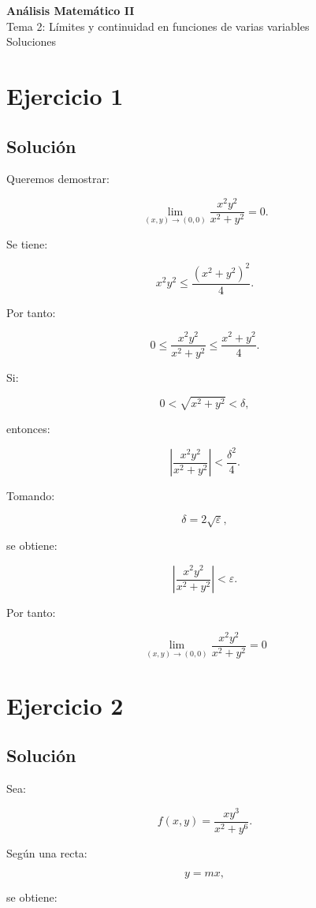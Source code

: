 \documentclass[11pt,a4paper]{article}
\begin{document}
\begin{center}
{\LARGE\bfseries Análisis Matemático II}\\[0.4em]
{\Large Tema 2: Límites y continuidad en funciones de varias variables}\\[0.4em]
{\large Soluciones}
\end{center}

\section{Ejercicio 1}
\subsection{Solución}

Queremos demostrar:

\[
\lim_{(x,y)\to(0,0)}
\frac{x^2y^2}{x^2+y^2}
=
0.
\]

Se tiene:

\[
x^2y^2
\leq
\frac{(x^2+y^2)^2}{4}.
\]

Por tanto:

\[
0
\leq
\frac{x^2y^2}{x^2+y^2}
\leq
\frac{x^2+y^2}{4}.
\]

Si:

\[
0<\sqrt{x^2+y^2}<\delta,
\]

entonces:

\[
\left|
\frac{x^2y^2}{x^2+y^2}
\right|
<
\frac{\delta^2}{4}.
\]

Tomando:

\[
\delta=2\sqrt{\varepsilon},
\]

se obtiene:

\[
\left|
\frac{x^2y^2}{x^2+y^2}
\right|
<
\varepsilon.
\]

Por tanto:

\[
\boxed{
\lim_{(x,y)\to(0,0)}
\frac{x^2y^2}{x^2+y^2}
=
0
}
\]

\section{Ejercicio 2}
\subsection{Solución}

Sea:

\[
f(x,y)
=
\frac{xy^3}{x^2+y^6}.
\]

Según una recta:

\[
y=mx,
\]

se obtiene:
\end{document}
